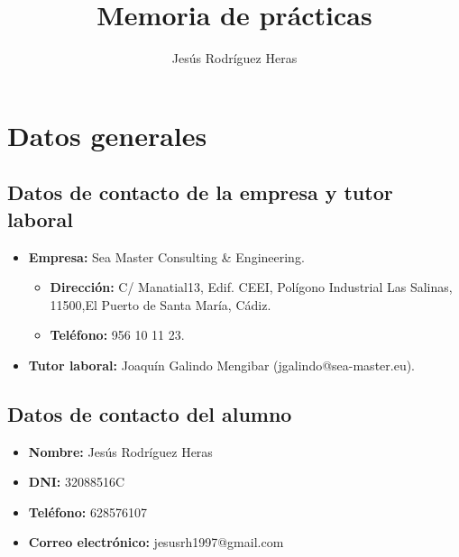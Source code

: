 \documentclass[12pt,letterpaper]{article}
\title{Memoria de prácticas}
\author{Jesús Rodríguez Heras}
\begin{document}
	
	\maketitle
%			
	\thispagestyle{empty}
	\newpage
	
	\tableofcontents
	\newpage
	
	
	
	
	\lstset{language=bash, numbers=left, numberstyle=\tiny, numbersep=10pt, firstnumber=1, stepnumber=1, basicstyle=\small\ttfamily, tabsize=1, extendedchars=true, inputencoding=utf8/latin1, breaklines=true}
	
\section{Datos generales}
\subsection{Datos de contacto de la empresa y tutor laboral}
\begin{itemize}
	\item \textbf{Empresa:} Sea Master Consulting \& Engineering.
	\begin{itemize}
		\item \textbf{Dirección:} C/ Manatial13, Edif. CEEI, Polígono Industrial Las Salinas, 11500,El Puerto de Santa María, Cádiz.
		\item \textbf{Teléfono:} 956 10 11 23.
	\end{itemize}
	\item \textbf{Tutor laboral:} Joaquín Galindo Mengibar (jgalindo@sea-master.eu).
\end{itemize}

\subsection{Datos de contacto del alumno}
\begin{itemize}
	\item \textbf{Nombre:} Jesús Rodríguez Heras
	\item \textbf{DNI:} 32088516C
	\item \textbf{Teléfono:} 628576107
	\item \textbf{Correo electrónico:} jesusrh1997@gmail.com
\end{itemize}
\end{document}

